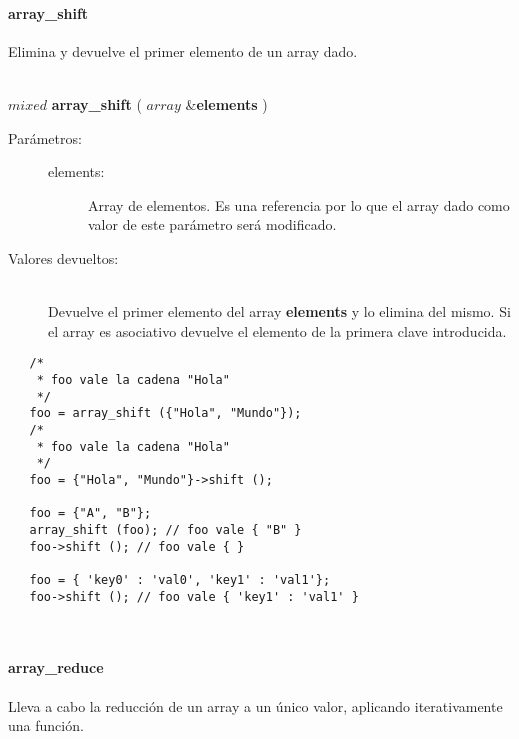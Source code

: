 \paragraph{array\_shift}
Elimina y devuelve el primer elemento de un array dado. 

\hfill \\ $mixed$ \textbf{array\_shift} ( $array$ \&\textbf{elements} )  
\begin{description}
\item [Parámetros:] \hfill 
   \begin{description}
   \item[elements:] Array de elementos. Es una referencia por lo que el array dado como valor de este parámetro será modificado. 
   \end{description}
\item[Valores devueltos:] \hfill \\
   Devuelve el primer elemento del array \textbf{elements} y lo elimina del mismo. Si el array es asociativo devuelve el
   elemento de la primera clave introducida.
\end{description}
     
\begin{lstlisting}   
   /*
    * foo vale la cadena "Hola"
    */
   foo = array_shift ({"Hola", "Mundo"}); 
   /*
    * foo vale la cadena "Hola"
    */
   foo = {"Hola", "Mundo"}->shift ();
   
   foo = {"A", "B"};
   array_shift (foo); // foo vale { "B" }
   foo->shift (); // foo vale { }
   
   foo = { 'key0' : 'val0', 'key1' : 'val1'};
   foo->shift (); // foo vale { 'key1' : 'val1' }
\end{lstlisting}
\hfill\\ 

\paragraph{array\_reduce}
Lleva a cabo la reducción de un array a un único valor, aplicando iterativamente una función. 

